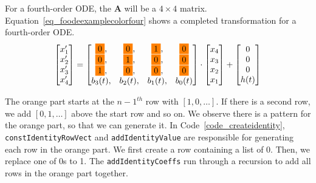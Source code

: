 For a fourth-order ODE, the \textbf{A} will be a $4 \times 4$ matrix. Equation~\ref{eq_foodeexamplecolorfour} shows a completed transformation for a fourth-order ODE.
\begin{equation} \label{eq_foodeexamplecolorfour}
	\begin{bmatrix}
		{x_{1}'} \\
    {x_{2}'} \\
    {x_{3}'} \\
    {x_{4}'}
	\end{bmatrix}
    = 
  \begin{bmatrix}
		\highlight{orange}{0}, & \highlight{orange}{0}, & \highlight{orange}{1}, & \highlight{orange}{0} \\
    \highlight{orange}{0}, & \highlight{orange}{1}, & \highlight{orange}{0}, & \highlight{orange}{0} \\
    \highlight{orange}{1}, & \highlight{orange}{0}, & \highlight{orange}{0}, & \highlight{orange}{0} \\
    {b_{3}(t)}, & {b_{2}(t)}, & {b_{1}(t)}, & {b_{0}(t)}
	\end{bmatrix}
    \cdot
  \begin{bmatrix}
		{x_{4}} \\
    {x_{3}} \\
    {x_{2}} \\
    {x_{1}}
	\end{bmatrix}
    + 
  \begin{bmatrix}
    {0} \\
    {0} \\
    {0} \\
    {h(t)}
	\end{bmatrix}
\end{equation}

The orange part starts at the ${n-1}^{th}$ row with $[1, 0, \dots]$. If there is a second row, we add $[0, 1, \dots]$ above the start row and so on. We observe there is a pattern for the orange part, so that we can generate it. In Code~\ref{code_createidentity}, \verb|constIdentityRowVect| and \verb|addIdentityValue| are responsible for generating each row in the orange part. We first create a row containing a list of 0. Then, we replace one of 0s to 1. The \verb|addIdentityCoeffs| run through a recursion to add all rows in the orange part together.

